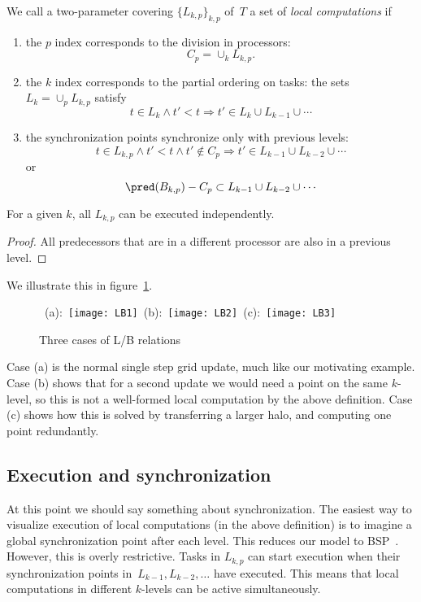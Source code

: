 \begin{definition}
  \label{def:localcomp}
  We call a two-parameter covering $\{L_{k,p}\}_{k,p}$ of~$T$ 
  a set of \emph{local computations} if
  \begin{enumerate}
  \item the $p$ index corresponds to the division in processors:
    \[ C_p = \cup_k L_{k,p}.  \]
  \item the $k$ index corresponds to the partial ordering on tasks:
    the sets $L_k=\cup_p L_{k,p}$ satisfy
    \[ t\in L_k \wedge t'<t \Rightarrow t'\in L_{k}\cup L_{k-1}\cup\cdots \]
  \item the synchronization points synchronize only with previous levels:
    \[ t\in L_{k,p}\wedge t'<t \wedge t'\not\in C_p \Rightarrow t'\in L_{k-1}\cup L_{k-2}\cup\cdots \]
    or
    \begin{equation}
      \pred(B_{k,p})-C_p\subset L_{k-1}\cup L_{k-2}\cup\cdots
      \label{eq:Lpred}
    \end{equation}
  \end{enumerate}
\end{definition}

\begin{theorem}
  For a given $k$, all $L_{k,p}$ can be executed independently.
\end{theorem}
\begin{proof}
  All predecessors that are in a different processor are also
  in a previous level.
\end{proof}

We illustrate this in figure~\ref{fig:LBs}.
\begin{figure}
  \hbox{%
    (a): \texttt{[image: LB1]}
    (b): \texttt{[image: LB2]}
    (c): \texttt{[image: LB3]}
  }
  \caption{Three cases of L/B relations}
  \label{fig:LBs}
\end{figure}
Case (a) is the normal single step grid update, much like our 
motivating example.
Case (b) shows that for a second update we would need a point
on the same $k$-level, so this is not a well-formed local computation
by the above definition.
Case (c) shows how this is solved by transferring a larger halo,
and computing one point redundantly.

\subsection{Execution and synchronization}

At this point we should say something about synchronization.
The easiest way to visualize execution of local computations (in the above
definition) is to imagine a global synchronization point after each level.
This reduces our model to BSP~\cite{Valiant:1990:BSP}. However, this is overly restrictive.
Tasks in $L_{k,p}$ can start execution when their synchronization points in~$L_{k-1},L_{k-2},\ldots$
have executed. This means that local computations in different $k$-levels can be
active simultaneously.

